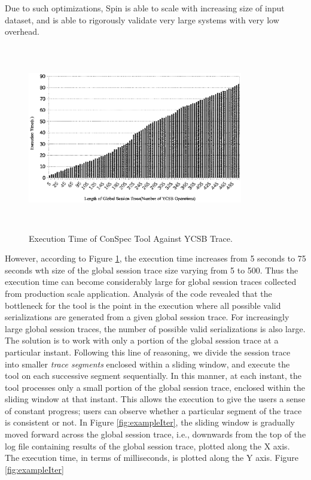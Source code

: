 \documentclass[journal,compsoc]{IEEEtran}
\begin{document}
 Due to such optimizations, Spin is able to scale with increasing size of input dataset, and is able to rigorously validate very large systems with very low overhead. 
 \begin{figure}%
        \includegraphics[width=3.7in,height=3.2in]
                    {conspecExecutionTimesFull.eps} %
        \caption{Execution Time of ConSpec Tool Against YCSB Trace.}
        \label{fig:examplefull}
\end{figure}
 \par However, according to Figure \ref{fig:examplefull}, the execution time increases from 5 seconds to 75 seconds wth size of the global session trace size varying from 5 to 500. Thus the execution time can become considerably large for global session traces collected from production scale application. %
 Analysis of the code revealed that the bottleneck for the tool is the point in the execution where all possible valid serializations are generated from a given global  session trace. For increasingly large global session traces, the number of possible valid serializations is also large. The solution is to work with only a portion of the global session trace at a particular instant. Following this line of reasoning, we divide the session trace into smaller \emph{trace segments} enclosed within a sliding window, and execute  the tool on  each successive segment sequentially. In this manner, at each instant, the tool processes only a small portion of the global session trace, enclosed within the sliding window at that instant. This allows the execution to give the users a sense of constant progress; users can observe whether a particular segment of the trace is consistent or not. In Figure \ref{fig:exampleIter}, the sliding window is gradually moved forward across the global session trace, i.e., downwards from the top of the log file containing results of the global session trace, plotted along the X axis. The execution time, in terms of milliseconds, is plotted along the Y axis. Figure  \ref{fig:exampleIter} %
\end{document}
